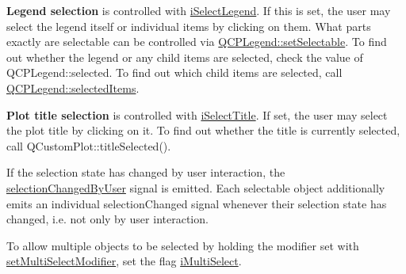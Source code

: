 {\bfseries Legend selection} is controlled with \hyperlink{classQCustomPlot_acc82d021129b61e550e36747d2e76d3aa9374fc5a7c88dfd92c951f22c96834f1}{i\-Select\-Legend}. If this is set, the user may select the legend itself or individual items by clicking on them. What parts exactly are selectable can be controlled via \hyperlink{classQCPLegend_aae042f6211e39305d13f7b18c1c301d9}{Q\-C\-P\-Legend\-::set\-Selectable}. To find out whether the legend or any child items are selected, check the value of Q\-C\-P\-Legend\-::selected. To find out which child items are selected, call \hyperlink{classQCPLegend_ac93eaf236e911d67aa8b88942ef45c5e}{Q\-C\-P\-Legend\-::selected\-Items}.

{\bfseries Plot title selection} is controlled with \hyperlink{classQCustomPlot_acc82d021129b61e550e36747d2e76d3aab149ac43f43d9cacc86be434243acfbf}{i\-Select\-Title}. If set, the user may select the plot title by clicking on it. To find out whether the title is currently selected, call Q\-Custom\-Plot\-::title\-Selected().

If the selection state has changed by user interaction, the \hyperlink{classQCustomPlot_a500c64a109bc773c973ad274f2fa4190}{selection\-Changed\-By\-User} signal is emitted. Each selectable object additionally emits an individual selection\-Changed signal whenever their selection state has changed, i.\-e. not only by user interaction.

To allow multiple objects to be selected by holding the modifier set with \hyperlink{classQCustomPlot_a8fc96e3b5138a06759a2a90c166df516}{set\-Multi\-Select\-Modifier}, set the flag \hyperlink{classQCustomPlot_acc82d021129b61e550e36747d2e76d3aa53148ccd6a25acf531df229639b7eb3a}{i\-Multi\-Select}.

